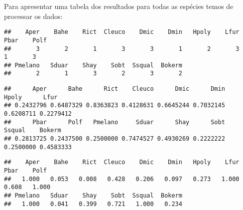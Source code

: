 \documentclass[
]{book}
\newenvironment{Shaded}{\begin{snugshade}}{\end{snugshade}}
\newcommand{\KeywordTok}[1]{\textcolor[rgb]{0.13,0.29,0.53}{\textbf{#1}}}
\newcommand{\NormalTok}[1]{#1}
\newcommand{\OperatorTok}[1]{\textcolor[rgb]{0.81,0.36,0.00}{\textbf{#1}}}
\newcommand{\StringTok}[1]{\textcolor[rgb]{0.31,0.60,0.02}{#1}}
\begin{document}
Para apresentar uma tabela dos resultados para todas as espécies temos de processar os dados:

\begin{Shaded}
\end{Shaded}

\begin{verbatim}
##    Aper    Bahe    Rict  Cleuco    Dmic    Dmin   Hpoly    Lfur    Pbar    Polf 
##       3       2       1       3       3       1       2       3       1       3 
## Pmelano   Sduar    Shay    Sobt  Ssqual  Bokerm 
##       2       1       3       2       3       2
\end{verbatim}

\begin{Shaded}
\end{Shaded}

\begin{verbatim}
##      Aper      Bahe      Rict    Cleuco      Dmic      Dmin     Hpoly      Lfur 
## 0.2432796 0.6487329 0.8363823 0.4128631 0.6645244 0.7032145 0.6208711 0.2279412 
##      Pbar      Polf   Pmelano     Sduar      Shay      Sobt    Ssqual    Bokerm 
## 0.2813725 0.2437500 0.2500000 0.7474527 0.4930269 0.2222222 0.2500000 0.4583333
\end{verbatim}

\begin{Shaded}
\end{Shaded}

\begin{verbatim}
##    Aper    Bahe    Rict  Cleuco    Dmic    Dmin   Hpoly    Lfur    Pbar    Polf 
##   1.000   0.053   0.008   0.428   0.206   0.097   0.273   1.000   0.608   1.000 
## Pmelano   Sduar    Shay    Sobt  Ssqual  Bokerm 
##   1.000   0.041   0.399   0.721   1.000   0.234
\end{verbatim}

\begin{Shaded}
\end{Shaded}
\end{document}
